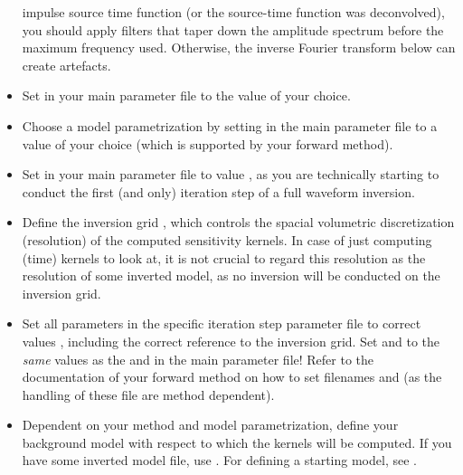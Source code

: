 \begin{itemize}
  impulse source time function (or the source-time function was deconvolved), you should apply filters that taper
  down the amplitude spectrum before the maximum frequency used. Otherwise, the inverse Fourier transform below
  can create artefacts.
%
\item Set  in your main parameter file to the value of your choice. 
%
\item Choose a model parametrization by setting  in the main parameter file 
to a value of your choice (which is supported by your forward method).
%
\item Set  in your main parameter file to value , as you are technically
starting to conduct the first (and only) iteration step of a full waveform inversion.
%
\item Define the inversion grid , which controls the spacial volumetric discretization 
(resolution) of the computed sensitivity kernels. In case of just computing (time) kernels to look at, it is not
crucial to regard this resolution as the resolution of some inverted model, as no inversion will be conducted on the 
inversion grid. 
%
\item Set all parameters in the specific iteration step parameter file to correct values 
, including the correct reference to the inversion grid. Set 
 and  to the \emph{same} values as the
 and  in the main parameter file!
Refer to the documentation of your forward method on how to set filenames 
and  (as the handling of these file are method dependent).
%
\item Dependent on your method and model parametrization, define your background model with respect to which the
kernels will be computed. If you have some inverted model file, use . For defining
a starting model, see .
%
\end{itemize}
%
